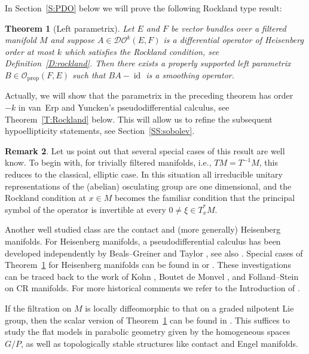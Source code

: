 \documentclass[reqno,12pt]{amsart}
\DeclareMathOperator{\id}{id}
\newcommand{\DO}{\mathcal D\mathcal O}
\newcommand\prop{\textrm{prop}}
\theoremstyle{plain}
\newtheorem{theorem}{Theorem}[section]
\theoremstyle{definition}
\newtheorem{remark}[theorem]{Remark}
\begin{document}
In Section~\ref{S:PDO} below we will prove the following Rockland \cite{R78} type result:


\begin{theorem}[Left parametrix]\label{T:para}
Let $E$ and $F$ be vector bundles over a filtered manifold $M$ and suppose $A\in\DO^k(E,F)$ is a differential operator of Heisenberg order at most $k$ which satisfies the Rockland condition, see Definition~\ref{D:rockland}.
Then there exists a properly supported left parametrix $B\in\mathcal O_\prop(F,E)$ such that $BA-\id$ is a smoothing operator.
\end{theorem}


Actually, we will show that the parametrix in the preceding theorem has order $-k$ in van~Erp and Yuncken's \cite{EY15} pseudodifferential calculus, see Theorem~\ref{T:Rockland} below.
This will allow us to refine the subsequent hypoellipticity statements, see Section~\ref{SS:sobolev}.


\begin{remark}
Let us point out that several special cases of this result are well know.
To begin with, for trivially filtered manifolds, i.e., $TM=T^{-1}M$, this reduces to the classical, elliptic case.
In this situation all irreducible unitary representations of the (abelian) osculating group are one dimensional, and the Rockland condition at $x\in M$ becomes the familiar condition that the principal symbol of the operator is invertible at every $0\neq\xi\in T_x^*M$.

Another well studied class are the contact and (more generally) Heisenberg manifolds.
For Heisenberg manifolds, a pseudodifferential calculus has been developed independently by Beals--Greiner \cite{BG88} and Taylor \cite{T84}, see also \cite{P08}.
Special cases of Theorem~\ref{T:para} for Heisenberg manifolds can be found in \cite[Theorem~8.4]{BG88} or \cite[Theorem~5.4.1]{P08}.
These investigations can be traced back to the work of Kohn \cite{K65}, Boutet de Monvel \cite{B74}, and Folland--Stein \cite{FS74} on CR manifolds.
For more historical comments we refer to the Introduction of \cite{BG88}.

If the filtration on $M$ is locally diffeomorphic to that on a graded nilpotent Lie group, then the scalar version of Theorem~\ref{T:para} can be found in \cite[Theorem~2.5(d)]{CGGP92}. 
This suffices to study the flat models in parabolic geometry given by the homogeneous spaces $G/P$, as well as topologically stable \cite{P16} structures like contact and Engel manifolds.
\end{remark}
\end{document}
